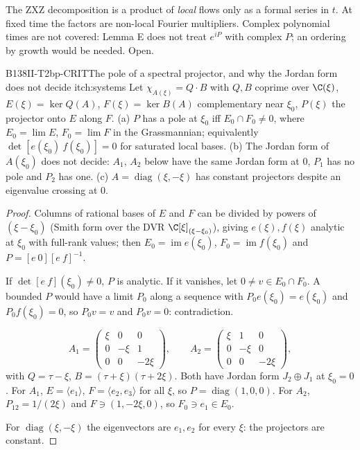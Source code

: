 \begin{caution}[title=Scope]
The ZXZ decomposition is a product of \emph{local} flows only as a formal series in $t$. At fixed time the factors are non-local Fourier multipliers. Complex polynomial times are not covered: Lemma E does not treat $e^{iP}$ with complex $P$; an ordering by growth would be needed. Open.
\end{caution}

\begin{dimcard}{B138}{II-T2bp-CRIT}{The pole of a spectral projector, and why the Jordan form does not decide it}{\pw}{ch:systems}
Let $\chi_{A(\xi)}=Q\cdot B$ with $Q,B$ coprime over $\C(\xi)$, $E(\xi)=\ker Q(A)$, $F(\xi)=\ker B(A)$ complementary near $\xi_0$, $P(\xi)$ the projector onto $E$ along $F$. (a) $P$ has a pole at $\xi_0$ iff $E_0\cap F_0\ne0$, where $E_0=\lim E$, $F_0=\lim F$ in the Grassmannian; equivalently $\det[e(\xi_0)\ f(\xi_0)]=0$ for saturated local bases. (b) The Jordan form of $A(\xi_0)$ does not decide: $A_1$, $A_2$ below have the same Jordan form at $0$, $P_1$ has no pole and $P_2$ has one. (c) $A=\operatorname{diag}(\xi,-\xi)$ has constant projectors despite an eigenvalue crossing at $0$.
\end{dimcard}

\begin{proof}
Columns of rational bases of $E$ and $F$ can be divided by powers of $(\xi-\xi_0)$ (Smith form over the DVR $\C[\xi]_{(\xi-\xi_0)}$), giving $e(\xi),f(\xi)$ analytic at $\xi_0$ with full-rank values; then $E_0=\operatorname{im}e(\xi_0)$, $F_0=\operatorname{im}f(\xi_0)$ and $P=[e\ 0][e\ f]^{-1}$.

If $\det[e\ f](\xi_0)\ne0$, $P$ is analytic. If it vanishes, let $0\ne v\in E_0\cap F_0$. A bounded $P$ would have a limit $P_0$ along a sequence with $P_0e(\xi_0)=e(\xi_0)$ and $P_0f(\xi_0)=0$, so $P_0v=v$ and $P_0v=0$: contradiction.

\[
A_1=\begin{pmatrix}\xi&0&0\\0&-\xi&1\\0&0&-2\xi\end{pmatrix},\qquad A_2=\begin{pmatrix}\xi&1&0\\0&-\xi&0\\0&0&-2\xi\end{pmatrix},
\]
with $Q=\tau-\xi$, $B=(\tau+\xi)(\tau+2\xi)$. Both have Jordan form $J_2\oplus J_1$ at $\xi_0=0$. For $A_1$, $E=\langle e_1\rangle$, $F=\langle e_2,e_3\rangle$ for all $\xi$, so $P=\operatorname{diag}(1,0,0)$. For $A_2$, $P_{12}=1/(2\xi)$ and $F\ni(1,-2\xi,0)$, so $F_0\ni e_1\in E_0$.

For $\operatorname{diag}(\xi,-\xi)$ the eigenvectors are $e_1,e_2$ for every $\xi$: the projectors are constant.

\end{proof}

